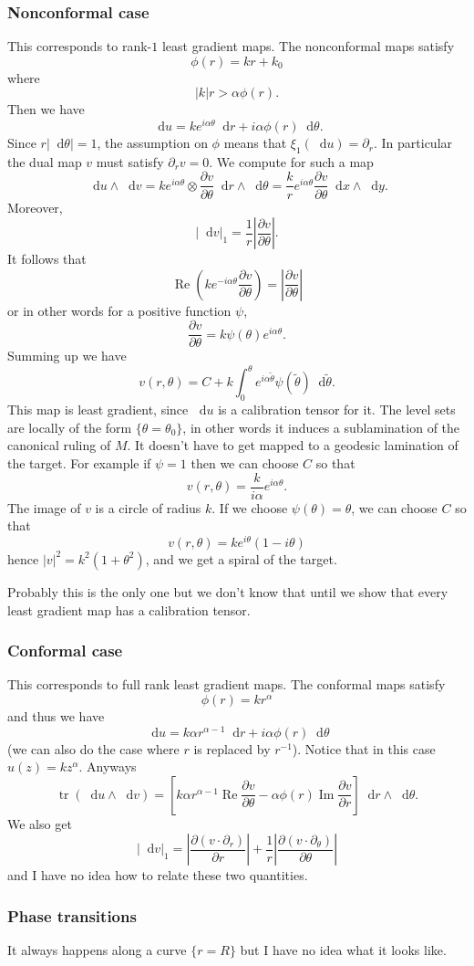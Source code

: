 \documentclass[reqno,11pt]{amsart}
\newcommand*\dif{\mathop{}\!\mathrm{d}}
\DeclareMathOperator{\tr}{tr}
\renewcommand{\Re}{\operatorname{Re}}
\renewcommand{\Im}{\operatorname{Im}}
\theoremstyle{definition}
\numberwithin{equation}{section}
\begin{document}
\subsubsection{Nonconformal case}
This corresponds to rank-$1$ least gradient maps.
The nonconformal maps satisfy 
$$\phi(r) = kr + k_0$$
where
$$|k| r > \alpha \phi(r).$$
Then we have
$$\dif u = ke^{i\alpha \theta} \dif r + i \alpha \phi(r) \dif \theta.$$
Since $r |\dif \theta| = 1$, the assumption on $\phi$ means that $\xi_1(\dif u) = \partial_r$.
In particular the dual map $v$ must satisfy $\partial_r v = 0$.
We compute for such a map 
$$\dif u \wedge \dif v = ke^{i\alpha \theta} \otimes \frac{\partial v}{\partial \theta} \dif r \wedge \dif \theta = \frac{k}{r} e^{i\alpha \theta} \frac{\partial v}{\partial \theta} \dif x \wedge \dif y.$$
Moreover, 
$$|\dif v|_1 = \frac{1}{r} \left|\frac{\partial v}{\partial \theta}\right|.$$
It follows that 
$$\Re\left(ke^{-i\alpha \theta} \frac{\partial v}{\partial \theta}\right) = \left|\frac{\partial v}{\partial \theta}\right|$$
or in other words for a positive function $\psi$,
$$\frac{\partial v}{\partial \theta} = k\psi(\theta) e^{i\alpha \theta}.$$
Summing up we have 
$$v(r, \theta) = C + k\int_0^\theta e^{i\alpha \tilde \theta} \psi(\tilde \theta) \dif \tilde \theta.$$
This map is least gradient, since $\dif u$ is a calibration tensor for it.
The level sets are locally of the form $\{\theta = \theta_0\}$, in other words it induces a sublamination of the canonical ruling of $M$.
It doesn't have to get mapped to a geodesic lamination of the target. For example if $\psi = 1$ then we can choose $C$ so that
$$v(r, \theta) = \frac{k}{i\alpha} e^{i\alpha \theta}.$$
The image of $v$ is a circle of radius $k$.
If we choose $\psi(\theta) = \theta$, we can choose $C$ so that 
$$v(r, \theta) = ke^{i\theta}(1 - i\theta)$$
hence $|v|^2 = k^2(1 + \theta^2)$, and we get a spiral of the target.

Probably this is the only one but we don't know that until we show that every least gradient map has a calibration tensor.


\subsubsection{Conformal case}
This corresponds to full rank least gradient maps.
The conformal maps satisfy 
$$\phi(r) = kr^\alpha$$
and thus we have
$$\dif u = k\alpha r^{\alpha - 1} \dif r + i\alpha \phi(r) \dif \theta$$
(we can also do the case where $r$ is replaced by $r^{-1}$).
Notice that in this case $u(z) = kz^\alpha$.
Anyways
$$\tr(\dif u \wedge \dif v) = \left[k\alpha r^{\alpha - 1} \Re \frac{\partial v}{\partial \theta} - \alpha \phi(r) \Im \frac{\partial v}{\partial r}\right] \dif r \wedge \dif \theta.$$
We also get 
$$|\dif v|_1 = \left|\frac{\partial (v \cdot \partial_r)}{\partial r}\right| + \frac{1}{r} \left|\frac{\partial (v \cdot \partial_\theta)}{\partial \theta}\right|$$
and I have no idea how to relate these two quantities.

\subsubsection{Phase transitions}
It always happens along a curve $\{r = R\}$ but I have no idea what it looks like.


\printbibliography
\end{document}
